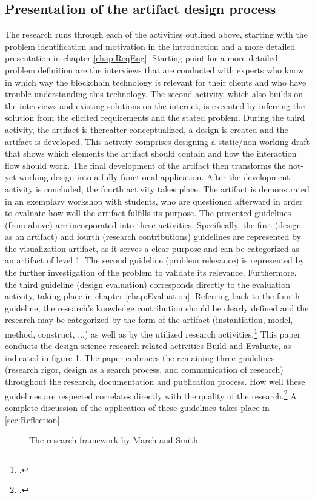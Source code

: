 \subsection{Presentation of the artifact design process}
The research runs through each of the activities outlined above, starting with the problem identification and motivation in the introduction and a more detailed presentation in chapter \ref{chap:ReqEng}. Starting point for a more detailed problem definition are the interviews that are conducted with experts who know in which way the blockchain technology is relevant for their clients and who have trouble understanding this technology. The second activity, which also builds on the interviews and existing solutions on the internet, is executed by inferring the solution from the elicited requirements and the stated problem. During the third activity, the artifact is thereafter conceptualized, a design is created and the artifact is developed. This activity comprises designing a static/non-working draft that shows which elements the artifact should contain and how the interaction flow should work. The final development of the artifact then transforms the not-yet-working design into a fully functional application. After the development activity is concluded, the fourth activity takes place. The artifact is demonstrated in an exemplary workshop with students, who are questioned afterward in order to evaluate how well the artifact fulfills its purpose. The presented guidelines (from above) are incorporated into these activities. Specifically, the first (design as an artifact) and fourth (research contributions) guidelines are represented by the visualization artifact, as it serves a clear purpose and can be categorized as an artifact of level 1. The second guideline (problem relevance) is represented by the further investigation of the problem to validate its relevance. Furthermore, the third guideline (design evaluation) corresponds directly to the evaluation activity, taking place in chapter \ref{chap:Evaluation}. Referring back to the fourth guideline, the research's knowledge contribution should be clearly defined and the research may be categorized by the form of the artifact (instantiation, model, method, construct, ...) as well as by the utilized research activities.\footcite[Cf.][p.255]{MarchDesignnaturalscience1995} This paper conducts the design science research related activities Build and Evaluate, as indicated in figure \ref{fig:researchFR}. The paper embraces the remaining three guidelines (research rigor, design as a search process, and communication of research) throughout the research, documentation and publication process. How well these guidelines are respected correlates directly with the quality of the research.\footcite[Cf.][p.19]{HevnerDesignResearchInformation2010} A complete discussion of the application of these guidelines takes place in \ref{sec:Reflection}.

\begin{figure}
    \centering
    
    \caption[The research framework by March and Smith.]{The research framework by March and Smith.\protect\footnotemark}
    \label{fig:researchFR}
\end{figure}
